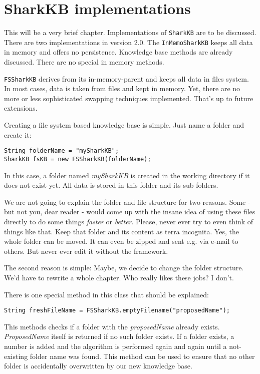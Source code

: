 \chapter{SharkKB implementations}
\label{sec:sharkkbimplementations}
This will be a very brief chapter. Implementations of {\tt SharkKB} are to be discussed. There are two implementations in version 2.0. The {\tt InMemoSharkKB} keeps all data in memory and offers no persistence. Knowledge base methods are already discussed. There are no special in memory methods.

{\tt FSSharkKB} derives from its in-memory-parent and keeps all data in files system. In most cases, data is taken from files and kept in memory. Yet, there are no more or less sophisticated swapping techniques implemented. That's up to future extensions.

Creating a file system based knowledge base is simple. Just name a folder and create it:

\begin{verbatim}
String folderName = "mySharkKB";
SharkKB fsKB = new FSSharkKB(folderName);
\end{verbatim}

In this case, a folder named {\it mySharkKB} is created in the working directory if it does not exist yet. All data is stored in this folder and its sub-folders. 

We are not going to explain the folder and file structure for two reasons. Some - but not you, dear reader - would come up with the insane idea of using these files directly to do some things {\it faster} or {\it better}. Please, never ever try to even think of things like that. Keep that folder and its content as terra incognita. Yes, the whole folder can be moved. It can even be zipped and sent e.g. via e-mail to others. But never ever edit it without the framework.

The second reason is simple: Maybe, we decide to change the folder structure. We'd have to rewrite a whole chapter. Who really likes these jobs? I don't.

There is one special method in this class that should be explained:

\begin{verbatim}
String freshFileName = FSSharkKB.emptyFilename("proposedName");
\end{verbatim}

This methods checks if a folder with the {\it proposedName} already exists. {\it ProposedName} itself is returned if no such folder exists. If a folder exists, a number is added and the algorithm is performed again and again until a not-existing folder name was found. This method can be used to ensure that no other folder is accidentally overwritten by our new knowledge base.
